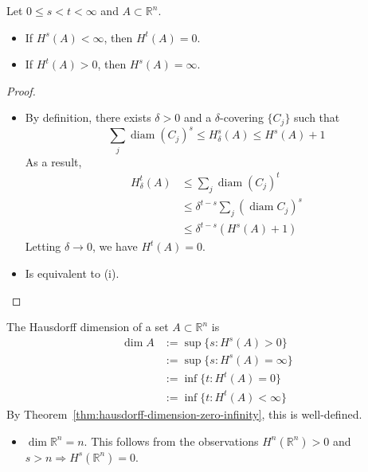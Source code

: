     \begin{theorem}\label{thm:hausdorff-dimension-zero-infinity}
        Let $0\leq s<t<\infty$ and $A\subset \mathbb{R}^{n}$.
        \begin{itemize}
            \item[(i)] If $H^{s}(A)<\infty$, then $H^{t}(A)=0$.
            \item[(ii)] If $H^{t}(A)>0$, then $H^{s}(A)=\infty$.
        \end{itemize}
    \end{theorem}
    \begin{proof}
        \begin{itemize}
            \item[(i)] By definition, there exists $\delta>0$ and a $\delta$-covering $\{ C_{j} \}$ such that
            \[
            \sum _{j}\operatorname{diam}(C_{j})^{s}\leq H^{s}_{\delta}(A)\leq H^{s}(A)+1
            \]
            As a result,
            \begin{align}
            H^{t}_{\delta}(A)&\leq \sum _{j}\operatorname{diam}(C_{j})^{t} \\
            &\leq \delta ^{t-s}\sum _{j}(\operatorname{diam}C_{j})^{s} \\
            &\leq \delta ^{t-s}(H^{s}(A)+1)
            \end{align}
            Letting $\delta\to 0$, we have $H^{t}(A)=0$.
            \item[(ii)] Is equivalent to (i).\qedhere
        \end{itemize}
    \end{proof}

    \begin{definition}
        The Hausdorff dimension of a set $A\subset \mathbb{R}^{n}$ is
        \begin{align}
        \operatorname{dim}A & :=\sup\{ s:H^{s}(A)>0 \} \\
         & :=\sup\{ s:H^{s}(A)=\infty \} \\
         & :=\operatorname{inf}\{ t:H^{t}(A)=0 \} \\
         & :=\operatorname{inf}\{ t:H^{t}(A)<\infty \}
        \end{align}
        By Theorem~\ref{thm:hausdorff-dimension-zero-infinity}, this is well-defined.
    \end{definition}

    \begin{remark}
        \begin{itemize}
            \item[(i)] $\operatorname{dim}\mathbb{R}^{n}=n$. This follows from the observations $H^{n}(\mathbb{R}^{n})>0$ and $s>n\Rightarrow H^{s}(\mathbb{R}^{n})=0$.
        \end{itemize}
    \end{remark}

